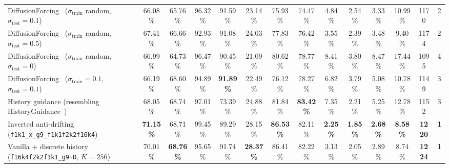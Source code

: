 \documentclass{article}
\begin{document}
\begin{table}[t]
{\begin{minipage}{\linewidth}
{\begin{tabular}{@{}l|ccccccc|cccc|cc@{}}
	\midrule	
	DiffusionForcing~\cite{chen2025diffusion} ($\sigma_{\text{train}}$ random, $\sigma_{\text{test}}=0.1$) &          66.08\% &          65.76\% &          96.32\% &          91.59\% &          23.14\% &          75.93\% &          74.47\% &           4.84\% &           2.54\% &           3.33\% &          10.99\% &          1170 &           2  \\  %
	DiffusionForcing~\cite{chen2025diffusion} ($\sigma_{\text{train}}$ random, $\sigma_{\text{test}}=0.5$) &          67.41\% &          66.66\% &          92.93\% &          91.08\% &          24.03\% &          77.83\% &          76.42\% &           3.55\% &           2.39\% &           3.48\% &           9.40\% &          1174 &           2  \\  %
	DiffusionForcing~\cite{chen2025diffusion} ($\sigma_{\text{train}}$ random, $\sigma_{\text{test}}=0$)   &          66.99\% &          64.73\% &          96.47\% &          90.45\% &          21.09\% &          80.62\% &          78.77\% &           8.41\% &           3.80\% &           8.47\% &          17.44\% &          1095 &           4  \\  %
	DiffusionForcing~\cite{chen2025diffusion} ($\sigma_{\text{train}}=0.1$, $\sigma_{\text{test}}=0.1$)    &          66.19\% &          68.60\% &          94.89\% & \textbf{91.89\%} &          22.49\% &          76.12\% &          78.27\% &           6.82\% &           3.79\% &           5.08\% &          10.78\% &          1149 &           3  \\  %
	History guidance (resembling HistoryGuidance~\cite{song2025history})                                   &          68.05\% &          68.74\% &          97.01\% &          73.39\% &          24.88\% &          81.84\% & \textbf{83.42\%} &           7.35\% &           2.21\% &           5.25\% &          12.78\% &          1152 &           3  \\  %
	\midrule
	Inverted anti-drifting (\texttt{f1k1\_x\_g9\_f1k1f2k2f16k4})                                           & \textbf{71.15\%} &          68.71\% &          99.45\% &          89.29\% &          28.15\% & \textbf{86.53\%} &          82.11\% &  \textbf{2.25\%} &  \textbf{1.85\%} &  \textbf{2.68\%} &  \textbf{8.58\%} & \textbf{1220} &  \textbf{1}  \\  %
	Vanilla + discrete history (\texttt{f16k4f2k2f1k1\_g9+D}, $K=256$)                                     &          70.01\% & \textbf{68.76\%} &          95.65\% &          91.74\% & \textbf{28.37\%} &          86.41\% &          82.22\% &           3.13\% &           2.05\% &           2.89\% &           8.74\% & \textbf{1224} &  \textbf{1}  \\  %
    \bottomrule
	\end{tabular}}
	\end{minipage}%
	}
\end{table}
\end{document}

